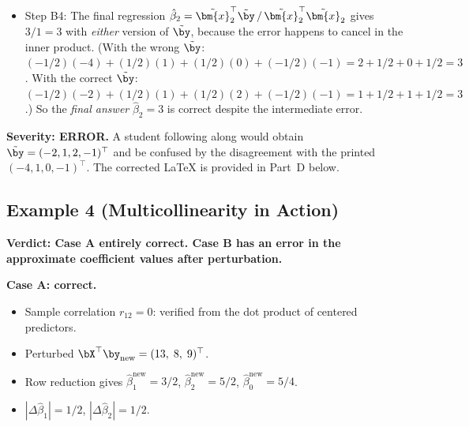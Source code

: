 \begin{itemize}[nosep]
  \item Step B4: The final regression $\hat\beta_2 = \tilde{\bm{x}}_2^\top\tilde{\by}\,/\,
        \tilde{\bm{x}}_2^\top\tilde{\bm{x}}_2$ gives $3/1 = 3$ with \emph{either}
        version of $\tilde{\by}$, because the error happens to cancel in the
        inner product.  (With the wrong $\tilde{\by}$:
        $(-1/2)(-4)+(1/2)(1)+(1/2)(0)+(-1/2)(-1) = 2+1/2+0+1/2 = 3$.
        With the correct $\tilde{\by}$:
        $(-1/2)(-2)+(1/2)(1)+(1/2)(2)+(-1/2)(-1) = 1+1/2+1+1/2 = 3$.)
        So the \emph{final answer} $\hat\beta_2 = 3$ is correct despite the
        intermediate error.
\end{itemize}

\medskip
\noindent\textbf{Severity: ERROR.}
A student following along would obtain $\tilde{\by} = (-2,1,2,-1)^\top$
and be confused by the disagreement with the printed $(- 4,1,0,-1)^\top$.
The corrected LaTeX is provided in Part~D below.



\subsection*{Example 4 (Multicollinearity in Action)}

\textbf{Verdict: Case A entirely correct.  Case B has an error in the
approximate coefficient values after perturbation.}

\medskip
\noindent\textbf{Case A: correct.}
\begin{itemize}[nosep]
  \item Sample correlation $r_{12} = 0$: verified from the dot product of centered predictors. \checkmark
  \item Perturbed $\bX^\top\by_{\text{new}} = (13,\;8,\;9)^\top$. \checkmark
  \item Row reduction gives $\hat\beta_1^{\text{new}} = 3/2$, $\hat\beta_2^{\text{new}} = 5/2$,
        $\hat\beta_0^{\text{new}} = 5/4$. \checkmark
  \item $|\Delta\hat\beta_1| = 1/2$, $|\Delta\hat\beta_2| = 1/2$. \checkmark
\end{itemize}

